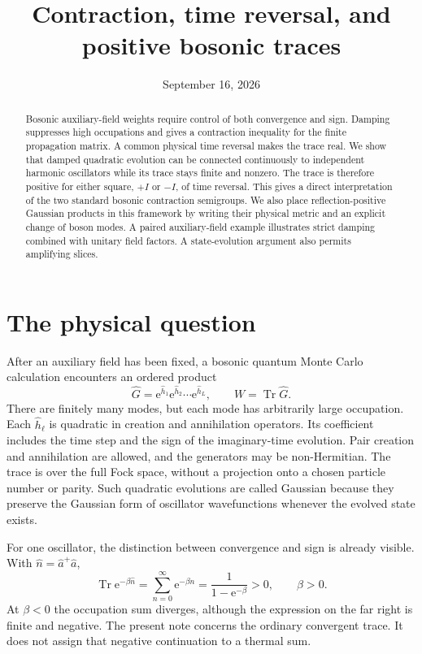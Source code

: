 \documentclass[11pt,a4paper]{article}
\title{Contraction, time reversal, and positive bosonic traces}
\author{}
\date{September 16, 2026}
\newcommand{\Tr}{\operatorname{Tr}}
\newcommand{\ee}{\mathrm e}
\numberwithin{equation}{section}
\begin{document}
\maketitle
\vspace{-1.5em}
\begin{abstract}
Bosonic auxiliary-field weights require control of both convergence and
sign. Damping suppresses high occupations and gives a contraction inequality
for the finite propagation matrix. A common physical time reversal makes
the trace real. We show that damped quadratic evolution can be connected
continuously to independent harmonic oscillators while its trace stays finite
and nonzero. The trace is therefore positive for either square, $+I$ or
$-I$, of time reversal. This gives a direct interpretation of the two
standard bosonic contraction semigroups. We also place reflection-positive
Gaussian products in this framework by writing their physical metric and
an explicit change of boson modes. A paired auxiliary-field example
illustrates strict damping combined with unitary field factors.
A state-evolution argument also permits amplifying slices.
\end{abstract}

\section{The physical question}

After an auxiliary field has been fixed, a bosonic quantum Monte Carlo
calculation encounters an ordered product
\begin{equation}
 \hat G=\ee^{\hat h_1}\ee^{\hat h_2}\cdots\ee^{\hat h_L},
 \qquad W=\Tr\hat G.
 \label{eq:weight}
\end{equation}
There are finitely many modes, but each mode has arbitrarily large occupation.
Each $\hat h_\ell$ is quadratic in creation and annihilation operators. Its
coefficient includes the time step and the sign of the imaginary-time
evolution. Pair creation and annihilation are allowed, and the generators may
be non-Hermitian. The trace is over the full Fock space, without a projection
onto a chosen particle number or parity.
Such quadratic evolutions are called Gaussian because they preserve the
Gaussian form of oscillator wavefunctions whenever the evolved state exists.

For one oscillator, the distinction between convergence and sign is already
visible. With $\hat n=\hat a^+\hat a$,
\begin{equation}
 \Tr\ee^{-\beta\hat n}
 =\sum_{n=0}^{\infty}\ee^{-\beta n}
 =\frac{1}{1-\ee^{-\beta}}>0,\qquad \beta>0.
 \label{eq:thermal_number}
\end{equation}
At $\beta<0$ the occupation sum diverges, although the expression on the far
right is finite and negative. The present note concerns the ordinary
convergent trace. It does not assign that negative continuation to a thermal
sum.
\end{document}
